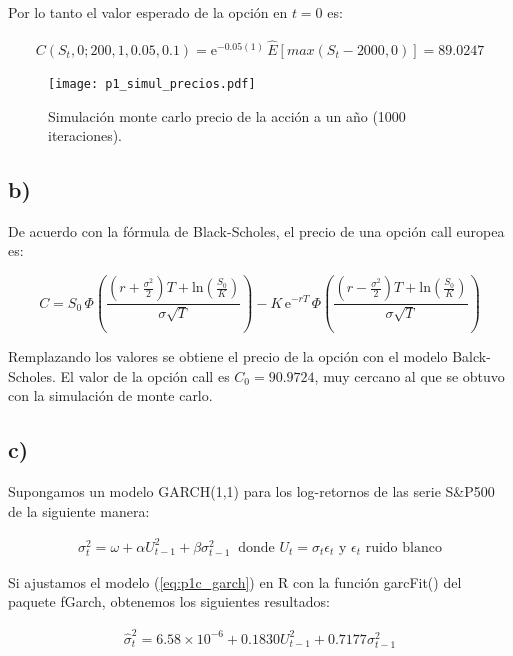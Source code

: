 \documentclass{tufte-handout}
\begin{document}
Por lo tanto el valor esperado de la opción en $t=0$ es:

\begin{align*}
	C(S_t,0;200,1,0.05,0.1)=\mathrm{e}^{-0.05(1)} \, \hat{E}[max(S_t - 2000, 0)] = 89.0247
\end{align*}

\begin{figure}[!h]
    \texttt{[image: p1\_simul\_precios.pdf]}
    \caption{Simulación monte carlo precio de la acción a un año (1000 iteraciones).}
    \label{fig:p1_simul_precios}
\end{figure}

\subsection*{b)}

De acuerdo con la fórmula de Black-Scholes, el precio de una opción call europea es:

\begin{equation}
	C = S_0 \, \Phi \left( \frac{(r+\frac{\sigma^2}{2})T + \mathrm{ln}(\frac{S_0}{K})}{\sigma \sqrt{T}} \right) - K \, \mathrm{e}^{-rT} \, \Phi \left( \frac{(r-\frac{\sigma^2}{2})T + \mathrm{ln}(\frac{S_0}{K})}{\sigma \sqrt{T}} \right)
\end{equation}


Remplazando los valores se obtiene el precio de la opción con el modelo Balck-Scholes. El valor de la opción call es $C_0=90.9724$, muy cercano al que se obtuvo con la simulación de monte carlo. 


\subsection*{c)}

Supongamos un modelo GARCH(1,1) para los log-retornos de las serie S\&P500 de la siguiente manera:

\begin{align} \label{eq:p1c_garch}
	\sigma_t^2 = \omega + \alpha U_{t-1}^2 + \beta \sigma_{t-1}^2 \: \text{ donde  } U_t = \sigma_t \epsilon_t \text{  y  } \epsilon_t \text{ ruido blanco}
\end{align}

Si ajustamos el modelo (\ref{eq:p1c_garch}) en R con la función garcFit() del paquete fGarch, obtenemos los siguientes resultados:

\begin{align*}
	\hat{\sigma}_t^2 = 6.58\times10^{-6} + 0.1830 U_{t-1}^2 + 0.7177 \sigma_{t-1}^2
\end{align*}
\end{document}
